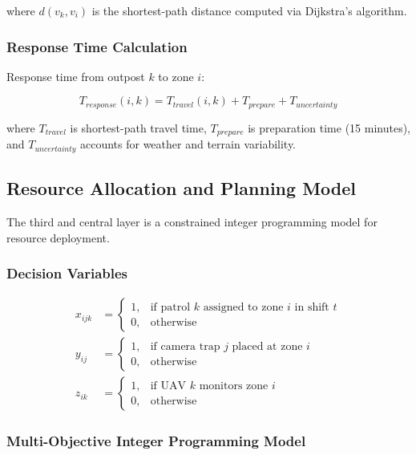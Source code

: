 where $d(v_k, v_i)$ is the shortest-path distance computed via Dijkstra's algorithm.

\subsubsection{Response Time Calculation}

Response time from outpost $k$ to zone $i$:

\begin{equation}
T_{response}(i, k) = T_{travel}(i, k) + T_{prepare} + T_{uncertainty}
\label{eq:response_time}
\end{equation}

where $T_{travel}$ is shortest-path travel time, $T_{prepare}$ is preparation time (15 minutes), and $T_{uncertainty}$ accounts for weather and terrain variability.

\subsection{Resource Allocation and Planning Model}

The third and central layer is a constrained integer programming model for resource deployment.

\subsubsection{Decision Variables}

\begin{align}
x_{ijk} &= \begin{cases}
1, & \text{if patrol } k \text{ assigned to zone } i \text{ in shift } t \\
0, & \text{otherwise}
\end{cases} \label{eq:decision_patrol} \\
y_{ij} &= \begin{cases}
1, & \text{if camera trap } j \text{ placed at zone } i \\
0, & \text{otherwise}
\end{cases} \label{eq:decision_camera} \\
z_{ik} &= \begin{cases}
1, & \text{if UAV } k \text{ monitors zone } i \\
0, & \text{otherwise}
\end{cases} \label{eq:decision_uav}
\end{align}

\subsubsection{Multi-Objective Integer Programming Model}


